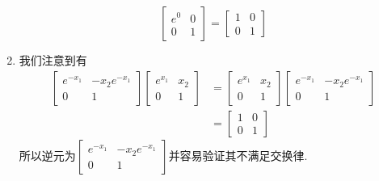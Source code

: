 \begin{solution}
\begin{enumerate}
		\begin{equation}
			\begin{bmatrix}e^0&0\\0&1\end{bmatrix}=\begin{bmatrix}1&0\\0&1\end{bmatrix}
		\end{equation}
		\item 我们注意到有
		\begin{equation}
			\begin{aligned}\begin{bmatrix}e^{-x_1}&-x_2e^{-x_1}\\0&1\end{bmatrix}\begin{bmatrix}e^{x_1}&x_2\\0&1\end{bmatrix}&=\begin{bmatrix}e^{x_1}&x_2\\0&1\end{bmatrix}\begin{bmatrix}e^{-x_1}&-x_2e^{-x_1}\\0&1\end{bmatrix}\\&=\begin{bmatrix}1&0\\0&1\end{bmatrix}\end{aligned}
		\end{equation}
		所以逆元为$\begin{bmatrix}e^{-x_1}&-x_2e^{-x_1}\\0&1\end{bmatrix}$并容易验证其不满足交换律.
	\end{enumerate}
\end{solution}
